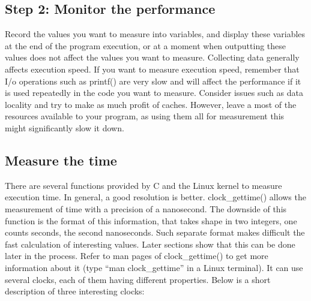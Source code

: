 \subsection{Step 2: Monitor the performance}
\label{sec:instrument}
Record the values you want to measure into variables, and display these variables at the end of the program execution, or at a moment when outputting these values does not affect the values you want to measure. Collecting data generally affects execution speed. If you want to measure execution speed, remember that I/o operations such as printf() are very slow and will affect the performance if it is used repeatedly in the code you want to measure. Consider issues such as data locality and try to make as much profit of caches. However, leave a most of the resources available to your program, as using them all for measurement this might significantly slow it down.

\subsection{Measure the time}
There are several functions provided by {C} and the Linux kernel to measure execution time. In general, a good resolution is better. clock\_gettime() allows the measurement of time with a precision of a nanosecond. The downside of this function is the format of this information, that takes shape in two integers, one counts seconds, the second nanoseconds. Such separate format makes difficult the fast calculation of interesting values. Later sections show that this can be done later in the process. Refer to man pages of clock\_gettime() to get more information about it (type ``man clock\_gettime'' in a Linux terminal). It can use several clocks, each of them having different properties. Below is a short description of three interesting clocks:

